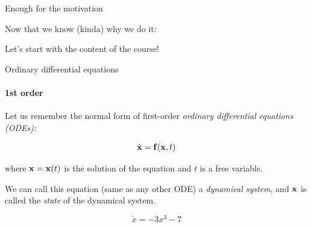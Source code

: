\documentclass{beamer}
\begin{document}
\begin{frame}{Enough for the motivation}
\begin{flushleft}


\begin{exampleblock}{Now that we know (kinda) why we do it:}

\hfill \break
Let's start with the content of the course!
\newline

\end{exampleblock}

\end{flushleft}
\end{frame}




\begin{frame}{Ordinary differential equations}
\framesubtitle{1st order}
\begin{flushleft}

Let us remember the normal form of first-order \emph{ordinary differential equations (ODEs):}

\begin{equation}
    \dot{\mathbf{x}} = \mathbf{f} (\mathbf{x}, t)
\end{equation}

where $\mathbf{x} = \mathbf{x}(t)$ is the solution of the equation and $t$ is a free variable.

\bigskip

\begin{definition}
We can call this equation (same as any other ODE) a \emph{dynamical system}, and $\mathbf{x}$ is called the \emph{state} of the dynamical system.  
\end{definition}

\begin{example}
\begin{equation}
    \dot{x} = -3 x^3 - 7 
\end{equation}
\end{example}

\end{flushleft}
\end{frame}
\end{document}
